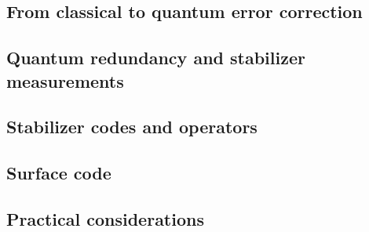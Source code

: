 \subsection{From classical to quantum error correction}


\subsection{Quantum redundancy and stabilizer measurements}


\subsection{Stabilizer codes and operators}


\subsection{Surface code}


\subsection{Practical considerations}
